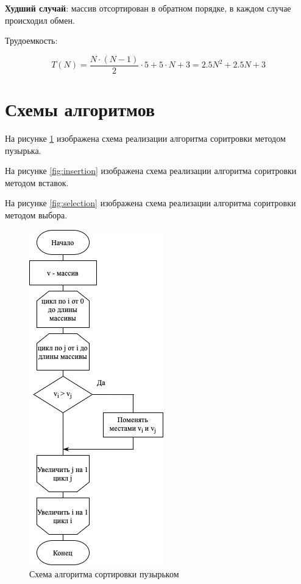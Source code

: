 \documentclass[a4paper,14pt, unknownkeysallowed]{extreport}
\begin{document}
\textbf{Худший случай}: массив отсортирован в обратном порядке, в каждом случае происходил обмен.

Трудоемкость:

\begin{equation}
    T(N) = \frac{N \cdot (N - 1)}{2} \cdot 5 + 5 \cdot N + 3 = 2.5N^2 + 2.5N + 3
\end{equation}

\section{Схемы алгоритмов}

На рисунке \ref{fig:bubble} изображена схема реализации алгоритма соритровки методом пузырька.

На рисунке \ref{fig:insertion} изображена схема реализации алгоритма соритровки методом вставок.

На рисунке \ref{fig:selection} изображена схема реализации алгоритма соритровки методом выбора.

\begin{figure}[h]
	\centering
	\includegraphics[scale=1]{bubble.png}
	\caption{Схема алгоритма сортировки пузырьком}
	\label{fig:bubble}
\end{figure}
\end{document}
